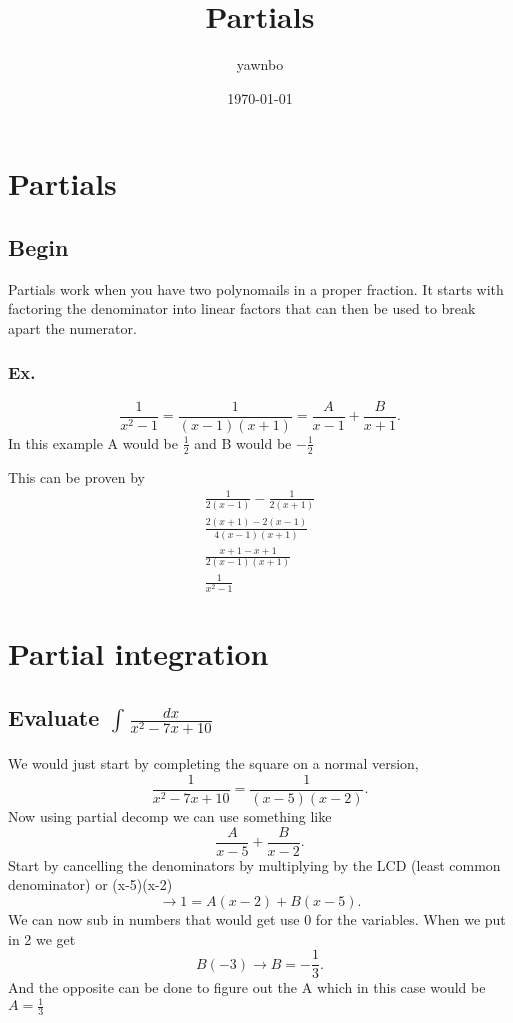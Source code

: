 \documentclass[a4paper]{article}
\title{Partials}
\author{yawnbo}
\date{\today}
\begin{document}
\section{Partials}%
\label{sec:Partials}
\subsection{Begin}%
\label{sub:Begin}

Partials work when you have two polynomails in a proper fraction. It starts with factoring the denominator into linear factors that can then be used to break apart the numerator. 

\subsubsection{Ex.}%
\label{sub:Ex.}

\[
\frac{1}{x^2-1}=\frac{1}{(x-1)(x+1)}=\frac{A}{x-1}+\frac{B}{x+1}
.\] 
In this example A would be $\frac{1}{2}$ and B would be $-\frac{1}{2}$ 

This can be proven by 
\begin{gather*}
\frac{1}{2(x-1)}-\frac{1}{2(x+1)} \\
\frac{2(x+1)-2(x-1)}{4(x-1)(x+1)} \\
\frac{x+1-x+1}{2(x-1)(x+1)} \\
\frac{1}{x^2-1}
\end{gather*}

\section{Partial integration}%
\label{sec:Partial integration}

\subsection{Evaluate $\int_{}^{} \frac{dx}{x^2-7x+10} $}%

We would just start by completing the square on a normal version,
\[
\frac{1}{x^2-7x+10}=\frac{1}{(x-5)(x-2)}
.\] 
Now using partial decomp we can use something like 
\[
  \frac{A}{x-5}+\frac{B}{x-2}
.\] 
Start by cancelling the denominators by multiplying by the LCD (least common denominator) or (x-5)(x-2)
\newpage
\[
  \to 1=A(x-2)+B(x-5)
.\] 
We can now sub in numbers that would get use 0 for the variables. When we put in 2 we get
\[
B(-3) \to B=-\frac{1}{3}
.\] 
And the opposite can be done to figure out the A which in this case would be $A=\frac{1}{3}$ 
\end{document}
